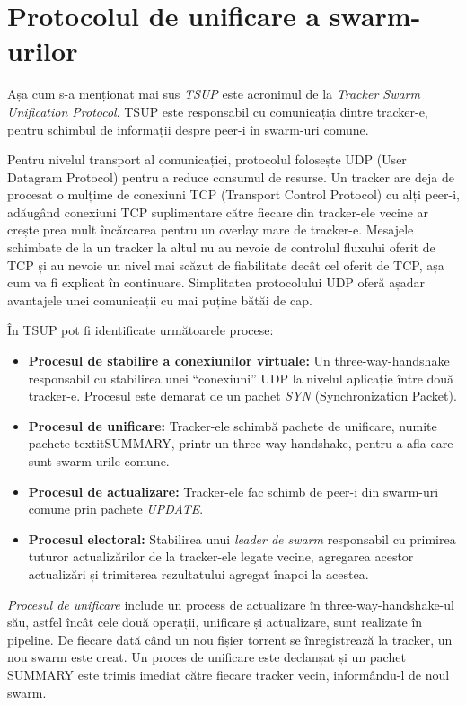 \section{Protocolul de unificare a swarm-urilor}
\label{sec:unified-tracker:swarm-unification}

Așa cum s-a menționat mai sus \textit{TSUP} este acronimul de la \textit{Tracker Swarm Unification Protocol}. TSUP este responsabil cu comunicația dintre tracker-e, pentru schimbul de informații despre peer-i în swarm-uri comune.

Pentru nivelul transport al comunicației, protocolul folosește UDP (User Datagram Protocol) pentru a reduce consumul de resurse. Un tracker are deja de procesat o mulțime de conexiuni TCP (Transport Control Protocol) cu alți peer-i, adăugând conexiuni TCP suplimentare către fiecare din tracker-ele vecine ar crește prea mult încărcarea pentru un overlay mare de tracker-e. Mesajele schimbate de la un tracker la altul nu au nevoie de controlul fluxului oferit de TCP și au nevoie un nivel mai scăzut de fiabilitate decât cel oferit de TCP, așa cum va fi explicat în continuare. Simplitatea protocolului UDP oferă așadar avantajele unei comunicații cu mai puține bătăi de cap.

În TSUP pot fi identificate următoarele procese:
\begin{itemize}
    \item \textbf{Procesul de stabilire a conexiunilor virtuale:} Un three-way-handshake responsabil cu stabilirea unei ``conexiuni'' UDP la nivelul aplicație între două tracker-e. Procesul este demarat de un pachet \textit{SYN} (Synchronization Packet).
    \item \textbf{Procesul de unificare:} Tracker-ele schimbă pachete de unificare, numite pachete textit{SUMMARY}, printr-un three-way-handshake, pentru a afla care sunt swarm-urile comune.
    \item \textbf{Procesul de actualizare:} Tracker-ele fac schimb de peer-i din swarm-uri comune prin pachete \textit{UPDATE}.
    \item \textbf{Procesul electoral:} Stabilirea unui \textit{leader de swarm} responsabil cu primirea tuturor actualizărilor de la tracker-ele legate vecine, agregarea acestor actualizări și trimiterea rezultatului agregat înapoi la acestea.
\end{itemize}

\textit{Procesul de unificare} include un process de actualizare în three-way-handshake-ul său, astfel încât cele două operații, unificare și actualizare, sunt realizate în pipeline. De fiecare dată când un nou fișier torrent se înregistrează la tracker, un nou swarm este creat. Un proces de unificare este declanșat și un pachet SUMMARY este trimis imediat către fiecare tracker vecin, informându-l de noul swarm.

